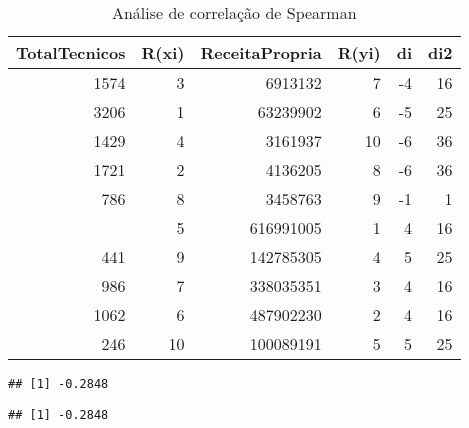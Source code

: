 \documentclass[11pt,]{style/krantz}
\makeatletter
\newenvironment{Shaded}{\begin{snugshade}}{\end{snugshade}}
\newcommand{\CommentTok}[1]{\textcolor[rgb]{0.56,0.35,0.01}{\textit{#1}}}
\newcommand{\DataTypeTok}[1]{\textcolor[rgb]{0.13,0.29,0.53}{#1}}
\newcommand{\DecValTok}[1]{\textcolor[rgb]{0.00,0.00,0.81}{#1}}
\newcommand{\KeywordTok}[1]{\textcolor[rgb]{0.13,0.29,0.53}{\textbf{#1}}}
\newcommand{\NormalTok}[1]{#1}
\newcommand{\OperatorTok}[1]{\textcolor[rgb]{0.81,0.36,0.00}{\textbf{#1}}}
\newcommand{\StringTok}[1]{\textcolor[rgb]{0.31,0.60,0.02}{#1}}
\newenvironment{kframe}{%
\medskip{}
\setlength{\fboxsep}{.8em}
 \def\at@end@of@kframe{}%
 \ifinner\ifhmode%
  \def\at@end@of@kframe{\end{minipage}}%
  \begin{minipage}{\columnwidth}%
 \fi\fi%
 \def\FrameCommand##1{\hskip\@totalleftmargin \hskip-\fboxsep
 \colorbox{shadecolor}{##1}\hskip-\fboxsep
     \hskip-\linewidth \hskip-\@totalleftmargin \hskip\columnwidth}%
 \MakeFramed {\advance\hsize-\width
   \@totalleftmargin\z@ \linewidth\hsize
   \@setminipage}}%
 {\par\unskip\endMakeFramed%
 \at@end@of@kframe}
\renewenvironment{Shaded}{\begin{kframe}}{\end{kframe}}
\theoremstyle{definition}
\theoremstyle{definition}
\theoremstyle{definition}
\theoremstyle{remark}
\makeatother
\begin{document}
\begin{table}[!h]

\caption{\label{tab:unnamed-chunk-107}Análise de correlação de Spearman}
\centering
\begin{tabular}{rrrrrr}
\toprule
TotalTecnicos & R(xi) & ReceitaPropria & R(yi) & di & di2\\
\midrule
1574 & 3 & 6913132 & 7 & -4 & 16\\
3206 & 1 & 63239902 & 6 & -5 & 25\\
1429 & 4 & 3161937 & 10 & -6 & 36\\
1721 & 2 & 4136205 & 8 & -6 & 36\\
786 & 8 & 3458763 & 9 & -1 & 1\\
\addlinespace
1275 & 5 & 616991005 & 1 & 4 & 16\\
441 & 9 & 142785305 & 4 & 5 & 25\\
986 & 7 & 338035351 & 3 & 4 & 16\\
1062 & 6 & 487902230 & 2 & 4 & 16\\
246 & 10 & 100089191 & 5 & 5 & 25\\
\bottomrule
\end{tabular}
\end{table}

\begin{Shaded}
\end{Shaded}

\begin{verbatim}
## [1] -0.2848
\end{verbatim}

\begin{Shaded}
\end{Shaded}

\begin{verbatim}
## [1] -0.2848
\end{verbatim}
\end{document}

